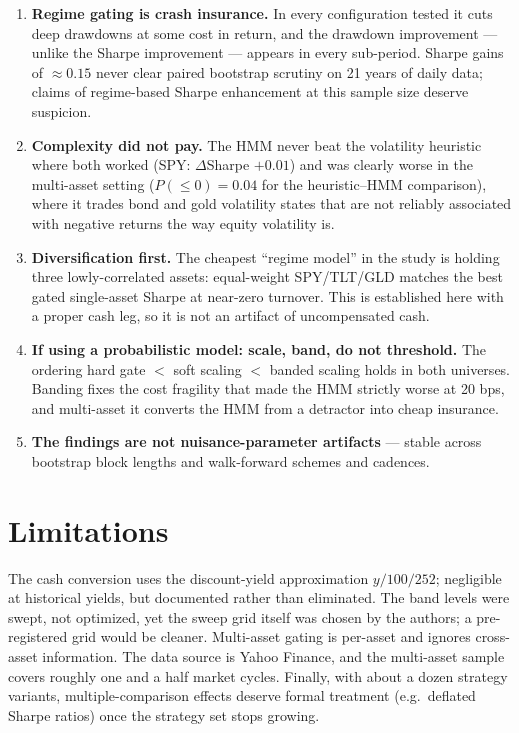 \documentclass[11pt]{article}
\begin{document}
\begin{enumerate}
  \item \textbf{Regime gating is crash insurance.} In every configuration
        tested it cuts deep drawdowns at some cost in return, and the
        drawdown improvement --- unlike the Sharpe improvement --- appears in
        every sub-period. Sharpe gains of $\approx 0.15$ never clear paired
        bootstrap scrutiny on 21 years of daily data; claims of regime-based
        Sharpe enhancement at this sample size deserve suspicion.
  \item \textbf{Complexity did not pay.} The HMM never beat the volatility
        heuristic where both worked (SPY: $\Delta$Sharpe $+0.01$) and was
        clearly worse in the multi-asset setting ($P(\le 0) = 0.04$ for the
        heuristic--HMM comparison), where it trades bond and gold volatility
        states that are not reliably associated with negative returns the way
        equity volatility is.
  \item \textbf{Diversification first.} The cheapest ``regime model'' in the
        study is holding three lowly-correlated assets: equal-weight
        SPY/TLT/GLD matches the best gated single-asset Sharpe at near-zero
        turnover. This is established here with a proper cash leg, so it is
        not an artifact of uncompensated cash.
  \item \textbf{If using a probabilistic model: scale, band, do not
        threshold.} The ordering hard gate $<$ soft scaling $<$ banded
        scaling holds in both universes. Banding fixes the cost fragility
        that made the HMM strictly worse at 20 bps, and multi-asset it
        converts the HMM from a detractor into cheap insurance.
  \item \textbf{The findings are not nuisance-parameter artifacts} ---
        stable across bootstrap block lengths and walk-forward schemes and
        cadences.
\end{enumerate}

\section{Limitations}

The cash conversion uses the discount-yield approximation $y/100/252$;
negligible at historical yields, but documented rather than eliminated. The
band levels were swept, not optimized, yet the sweep grid itself was chosen by
the authors; a pre-registered grid would be cleaner. Multi-asset gating is
per-asset and ignores cross-asset information. The data source is Yahoo
Finance, and the multi-asset sample covers roughly one and a half market
cycles. Finally, with about a dozen strategy variants, multiple-comparison
effects deserve formal treatment (e.g.\ deflated Sharpe ratios) once the
strategy set stops growing.
\end{document}
